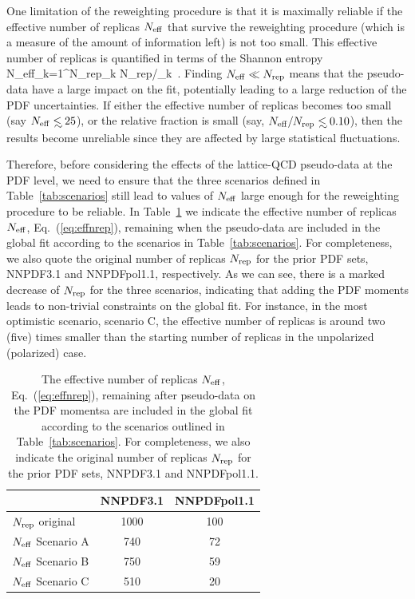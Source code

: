 One limitation of the reweighting procedure is that it is maximally 
reliable if the effective number of replicas $N_{\rm eff}$ that survive the 
reweighting procedure (which is a measure of the amount
of information left) is not too small.
%
This effective number of replicas is quantified in terms of the Shannon 
entropy~\cite{Ball:2011gg,Ball:2010gb}
\be
\label{eq:effnrep}
N_{\rm eff}\equiv \exp\lc {}\sum_{k=1}^{N_{\rm rep}}\omega_k
\log \lp N_{\rm rep}/\omega_k\rp\rc \, .
\ee
%
Finding $N_{\rm eff}\ll N_{\rm rep}$ means that the pseudo-data
have a large impact on the fit, potentially leading to a large
reduction of the PDF uncertainties.
%
If either the effective number of replicas becomes too small 
(say $N_{\rm eff}\lsim 25$), or the relative fraction is small 
(say, $N_{\rm eff}/N_{\rm rep}\lsim 0.10$), then the results become unreliable 
since they are affected by large statistical fluctuations.

Therefore, before considering the effects
of the lattice-QCD pseudo-data at the PDF
level, we need to ensure that the
three scenarios defined
in Table~\ref{tab:scenarios} still lead
to values of $N_{\rm eff}$ large enough for
the reweighting procedure to be reliable.
%
In Table~\ref{tab:neff} we indicate the effective number of replicas
$N_{\rm eff}$, Eq.~(\ref{eq:effnrep}), remaining when the pseudo-data
are included in the global
fit according to the scenarios in Table~\ref{tab:scenarios}.
%
For completeness, we also quote the original number
of replicas $N_{\rm rep}$ for the prior
PDF sets, NNPDF3.1 and NNPDFpol1.1, respectively.
%
As we can see, there is a marked decrease of $N_{\rm rep}$
for the three scenarios, indicating that adding the
PDF moments leads to non-trivial constraints on the global fit.
%
For instance, in the most optimistic scenario, scenario C, the effective 
number of replicas is around two (five) times smaller than the starting 
number of replicas in the unpolarized (polarized) case.

\begin{table}[!t]
\centering
\footnotesize
\renewcommand{\arraystretch}{1.3} 
\begin{tabular}{lcc}
\toprule
&  NNPDF3.1  &  NNPDFpol1.1 \\
\midrule
$N_{\rm rep}$ original   &   1000 &  100   \\
$N_{\rm eff}$ Scenario A    &   740  &  72   \\
$N_{\rm eff}$ Scenario B    &   750   &   59  \\
$N_{\rm eff}$ Scenario C   &   510  &   20  \\
\bottomrule
\end{tabular}
\caption{\small The effective number of replicas
$N_{\rm eff}$, Eq.~(\ref{eq:effnrep}), remaining after pseudo-data
on the PDF momentsa are included in the global
fit according to the scenarios outlined
in Table~\ref{tab:scenarios}.
%
For completeness, we also indicate the original number
of replicas $N_{\rm rep}$ for the prior
PDF sets, NNPDF3.1 and NNPDFpol1.1.
\label{tab:neff}}
\end{table}

